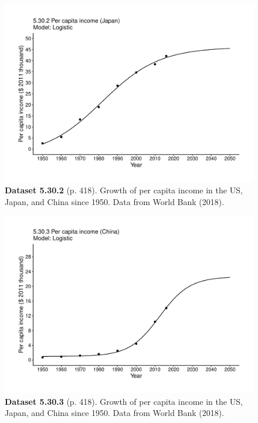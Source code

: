 \documentclass[aps,rmp,preprint,superscriptaddress,10pt,onecolumn]{article}
\begin{document}
\clearpage
\begin{figure}[h]
\includegraphics[width=\textwidth]{output/figs-ggplot/5.30.2.pdf}
\caption*{\textbf{Dataset 5.30.2} (p. 418). Growth of per capita income in the US, Japan, and China since 1950. Data from World Bank (2018).}
\end{figure}
	
\clearpage
\begin{figure}[h]
\includegraphics[width=\textwidth]{output/figs-ggplot/5.30.3.pdf}
\caption*{\textbf{Dataset 5.30.3} (p. 418). Growth of per capita income in the US, Japan, and China since 1950. Data from World Bank (2018).}
\end{figure}
	
\end{document}
